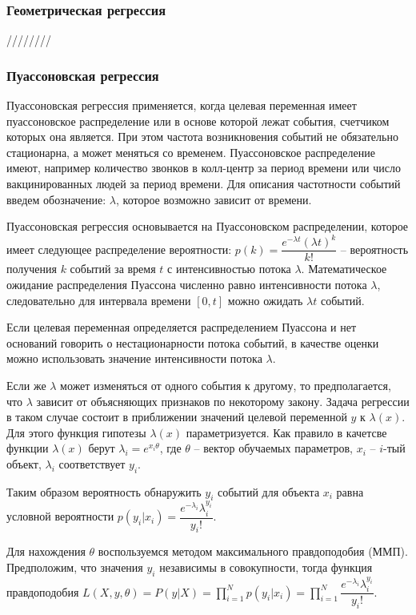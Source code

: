 \subsubsection{Геометрическая регрессия}

////////

\subsubsection{Пуассоновская регрессия}

Пуассоновская регрессия применяется, когда целевая переменная имеет пуассоновское распределение или в основе которой лежат события, счетчиком которых она является. При этом частота возникновения событий не обязательно стационарна, а может меняться со временем. Пуассоновское распределение имеют, например количество звонков в колл-центр за период времени или число вакцинированных людей за период времени. Для описания частотности событий введем обозначение: $\lambda$, которое возможно зависит от времени.

Пуассоновская регрессия основывается на Пуассоновском распределении, которое имеет следующее распределение вероятности: $p(k) = \dfrac{e^{-\lambda t} (\lambda t)^k}{k!}$ -- вероятность получения $k$ событий за время $t$ с интенсивностью потока $\lambda$. Математическое ожидание распределения Пуассона численно равно интенсивности потока $\lambda$, следовательно для интервала времени $[0, t]$ можно ожидать $\lambda t$ событий.

Если целевая переменная определяется распределением Пуассона и нет оснований говорить о нестационарности потока событий, в качестве оценки можно использовать значение интенсивности потока $\lambda$.

Если же $\lambda$ может изменяться от одного события к другому, то предполагается, что $\lambda$ зависит от объясняющих признаков по некоторому закону. Задача регрессии в таком случае состоит в приближении значений целевой переменной $y$ к $\lambda(x)$. Для этого функция гипотезы $\lambda(x)$ параметризуется. Как правило в качетсве функции $\lambda(x)$ берут $\lambda_i = e^{x_i \theta}$, где $\theta$ -- вектор обучаемых параметров, $x_i$ -- $i$-тый объект, $\lambda_i$ соответствует $y_i$.

Таким образом вероятность обнаружить $y_i$ событий для объекта $x_i$ равна условной вероятности $p(y_i | x_i) = \dfrac{e^{-\lambda_i} \lambda_i^{y_i}}{y_i!}$.

Для нахождения $\theta$ воспользуемся методом максимального правдоподобия (ММП). Предположим, что значения $y_i$ независимы в совокупности, тогда функция правдоподобия $L(X, y, \theta)=P(y | X) = \prod\limits_{i=1}^{N} p(y_i | x_i) = \prod\limits_{i=1}^{N} \dfrac{e^{-\lambda_i} \lambda_i^{y_i}}{y_i!}$.

